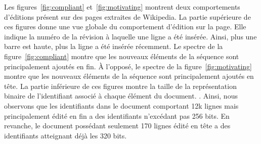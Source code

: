 Les figures~\ref{fig:compliant} et~\ref{fig:motivating} montrent deux
comportements d'éditions présent sur des pages extraites de Wikipedia. La partie
supérieure de ces figures donne une vue globale du comportement d'édition sur la
page. Elle indique la numéro de la révision à laquelle une ligne a été
insérée. Ainsi, plus une barre est haute, plus la ligne a été insérée
récemment. Le spectre de la figure~\ref{fig:compliant} montre que les nouveaux
éléments de la séquence sont principalement ajoutés en fin. À l'opposé, le
spectre de la figure~\ref{fig:motivating} montre que les nouveaux éléments de la
séquence sont principalement ajoutés en tête. La partie inférieure de ces
figures montre la taille de la représentation binaire de l'identifiant associé à
chaque élément du document. . Ainsi,
nous observons que les identifiants dans le document comportant 12k lignes mais
principalement édité en fin a des identifiants n'excédant pas 256 bits. En
revanche, le document possédant seulement 170 lignes édité en tête a des
identifiants atteignant déjà les 320 bits.


